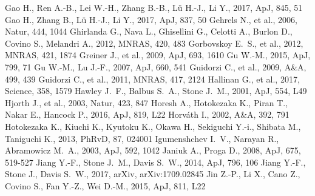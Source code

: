 \documentclass[a4paper,fleqn,usenatbib]{mnras}
\begin{document}
\begin{thebibliography}{207}
 Gao H., Ren A.-B., Lei W.-H., Zhang B.-B., L{\"u} H.-J., Li Y., 2017, ApJ, 845, 51
 Gao H., Zhang B., L{\"u} H.-J., Li Y., 2017, ApJ, 837, 50
 Gehrels N., et al., 2006, Natur, 444, 1044
 Ghirlanda G., Nava L., Ghisellini G., Celotti A., Burlon D., Covino S., Melandri A., 2012, MNRAS, 420, 483
 Gorbovskoy E.~S., et al., 2012, MNRAS, 421, 1874
 Greiner J., et al., 2009, ApJ, 693, 1610
 Gu W.-M., 2015, ApJ, 799, 71
 Gu W.-M., Lu J.-F., 2007, ApJ, 660, 541
 Guidorzi C., et al., 2009, A\&A, 499, 439
 Guidorzi C., et al., 2011, MNRAS, 417, 2124
 Hallinan G., et al., 2017, Science, 358, 1579 
 Hawley J.~F., Balbus S.~A., Stone J.~M., 2001, ApJ, 554, L49
 Hjorth J., et al., 2003, Natur, 423, 847
 Horesh A., Hotokezaka K., Piran T., Nakar E., Hancock P., 2016, ApJ, 819, L22
 Horv{\'a}th I., 2002, A\&A, 392, 791
 Hotokezaka K., Kiuchi K., Kyutoku K., Okawa H., Sekiguchi Y.-i., Shibata M., Taniguchi K., 2013, PhRvD, 87, 024001
 Igumenshchev I.~V., Narayan R., Abramowicz M.~A., 2003, ApJ, 592, 1042
 Janiuk A., Proga D., 2008, ApJ, 675, 519-527
 Jiang Y.-F., Stone J.~M., Davis S.~W., 2014, ApJ, 796, 106
 Jiang Y.-F., Stone J., Davis S.~W., 2017, arXiv, arXiv:1709.02845
 Jin Z.-P., Li X., Cano Z., Covino S., Fan Y.-Z., Wei D.-M., 2015, ApJ, 811, L22

\end{thebibliography}
\end{document}
